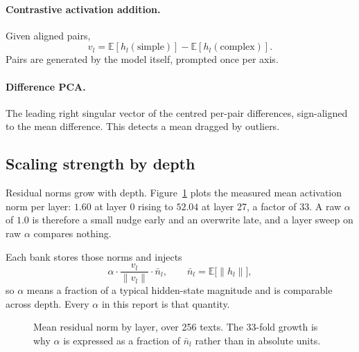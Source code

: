 \documentclass[twocolumn,10pt,a4paper]{article}
\begin{document}
\paragraph{Contrastive activation addition.} Given aligned pairs,
\begin{equation}
v_l = \mathbb{E}[h_l(\text{simple})] - \mathbb{E}[h_l(\text{complex})].
\end{equation}
Pairs are generated by the model itself, prompted once per axis.

\paragraph{Difference PCA.} The leading right singular vector of the centred
per-pair differences, sign-aligned to the mean difference. This detects a mean
dragged by outliers.

\subsection{Scaling strength by depth}

Residual norms grow with depth. Figure~\ref{fig:refnorm} plots the measured mean
activation norm per layer: $1.60$ at layer 0 rising to $52.04$ at layer 27, a
factor of 33. A raw $\alpha$ of $1.0$ is therefore a small nudge early and an
overwrite late, and a layer sweep on raw $\alpha$ compares nothing.

Each bank stores those norms and injects
\begin{equation}
\alpha \cdot \frac{v_l}{\lVert v_l \rVert} \cdot \bar n_l ,
\qquad
\bar n_l = \mathbb{E}\bigl[\lVert h_l \rVert\bigr],
\label{eq:scale}
\end{equation}
so $\alpha$ means a fraction of a typical hidden-state magnitude and is
comparable across depth. Every $\alpha$ in this report is that quantity.

\begin{figure}[t]
\centering
{}
\caption{Mean residual norm by layer, over 256 texts. The 33-fold growth is why
$\alpha$ is expressed as a fraction of $\bar n_l$ rather than in absolute units.}
\label{fig:refnorm}
\end{figure}
\end{document}
